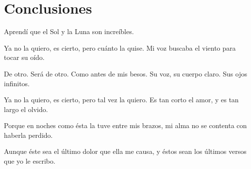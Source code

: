 

\chapter*{Conclusiones}

Aprendí que el Sol y la Luna son increíbles.

Ya no la quiero, es cierto, pero cuánto la quise.
Mi voz buscaba el viento para tocar su oído.

De otro. Será de otro. Como antes de mis besos.
Su voz, su cuerpo claro. Sus ojos infinitos.

Ya no la quiero, es cierto, pero tal vez la quiero.
Es tan corto el amor, y es tan largo el olvido.

Porque en noches como ésta la tuve entre mis
brazos,
mi alma no se contenta con haberla perdido.

Aunque éste sea el último dolor que ella me causa,
y éstos sean los últimos versos que yo le escribo.


\cleardoublepage